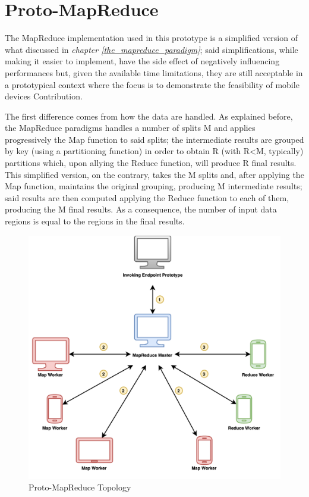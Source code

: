 \section{Proto-MapReduce}
The MapReduce implementation used in this prototype is a simplified version of what discussed in \textit{chapter \ref{the_mapreduce_paradigm}}; said simplifications, while making it easier to implement, have the side effect of negatively influencing performances but, given the available time limitations, they are still acceptable in a prototypical context where the focus is to demonstrate the feasibility of mobile devices Contribution.

The first difference comes from how the data are handled. As explained before, the MapReduce paradigms handles a number of splits M and applies progressively the Map function to said splits; the intermediate results are grouped by key (using a partitioning function) in order to obtain R (with R<M, typically) partitions which, upon allying the Reduce function, will produce R final results. This simplified version, on the contrary, takes the M splits and, after applying the Map function, maintains the original grouping, producing M intermediate results; said results are then computed applying the Reduce function to each of them, producing the M final results. As a consequence, the number of input data regions is equal to the regions in the final results.

\begin{figure}[!ht]
    \centering
    \includegraphics[scale=1.1]{document/chapters/chapter_7/images/proto_mapreduce.png}
    \caption{Proto-MapReduce Topology}
    \label{fig:proto_mapreduce}
\end{figure}

